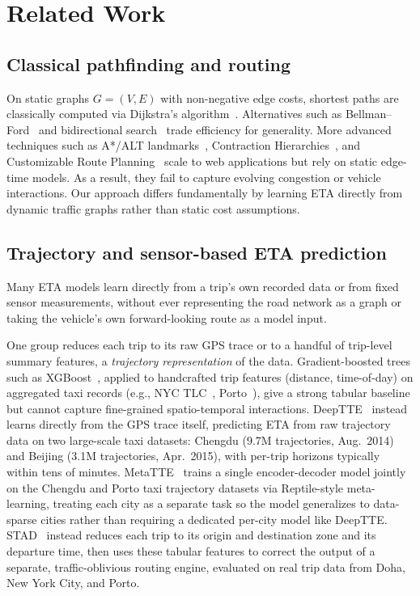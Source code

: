 \section{Related Work}\label{sec2}

\subsection{Classical pathfinding and routing}
On static graphs $G=(V,E)$ with non-negative edge costs, shortest paths are classically computed via Dijkstra's algorithm~\cite{dijkstra1959}. Alternatives such as Bellman--Ford~\cite{bellman1958routing} and bidirectional search~\cite{pohl1971bi} trade efficiency for generality. More advanced techniques such as A*/ALT landmarks~\cite{goldberg2005}, Contraction Hierarchies~\cite{geisberger2008}, and Customizable Route Planning~\cite{delling2011} scale to web applications but rely on static edge-time models. As a result, they fail to capture evolving congestion or vehicle interactions. Our approach differs fundamentally by learning ETA directly from dynamic traffic graphs rather than static cost assumptions.

\subsection{Trajectory and sensor-based ETA prediction}\label{sec:rw-no-graph}
Many ETA models learn directly from a trip's own recorded data or from fixed sensor measurements, without ever representing the road network as a graph or taking the vehicle's own forward-looking route as a model input.

One group reduces each trip to its raw GPS trace or to a handful of trip-level summary features, a \emph{trajectory representation} of the data. Gradient-boosted trees such as XGBoost~\cite{chen2016xgboost}, applied to handcrafted trip features (distance, time-of-day) on aggregated taxi records (e.g., NYC TLC~\cite{nyc_tlc}, Porto~\cite{moreira2013porto}), give a strong tabular baseline but cannot capture fine-grained spatio-temporal interactions. DeepTTE~\cite{deepTTE2018} instead learns directly from the GPS trace itself, predicting ETA from raw trajectory data on two large-scale taxi datasets: Chengdu (9.7M trajectories, Aug.\ 2014) and Beijing (3.1M trajectories, Apr.\ 2015), with per-trip horizons typically within tens of minutes. MetaTTE~\cite{wang2022metatte} trains a single encoder-decoder model jointly on the Chengdu and Porto taxi trajectory datasets via Reptile-style meta-learning, treating each city as a separate task so the model generalizes to data-sparse cities rather than requiring a dedicated per-city model like DeepTTE. STAD~\cite{abbar2020stad} instead reduces each trip to its origin and destination zone and its departure time, then uses these tabular features to correct the output of a separate, traffic-oblivious routing engine, evaluated on real trip data from Doha, New York City, and Porto.

